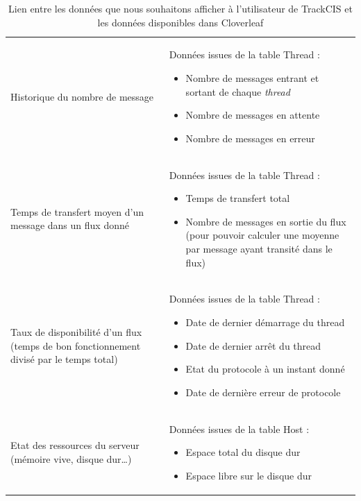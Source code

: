 			\begin{table}[H]
				\centering
				\caption{\label{donnees_threads} Lien entre les données que nous
				souhaitons afficher à l'utilisateur de TrackCIS et les données disponibles
				dans Cloverleaf}
				\begin{tabular}{| p{5cm} | p{8cm} |}
					\hline
						\thead{Type de statistique}
						&\thead{Données dans la table Thread}
						\\
					\hline
						Historique du nombre de message
						&
						Données issues de la table Thread :
						\begin{itemize}
						  \item Nombre de messages entrant et sortant de chaque \textit{thread}
						  \item Nombre de messages en attente
						  \item Nombre de messages en erreur
						\end{itemize}
						\\
					\hline
						Temps de transfert moyen d'un message dans un flux donné
						&
						Données issues de la table Thread :
						\begin{itemize}
						  \item Temps de transfert total
						  \item Nombre de messages en sortie du flux (pour pouvoir calculer une
						  moyenne par message ayant transité dans le flux)
						\end{itemize}
						\\
					\hline
						Taux de disponibilité d'un flux (temps de bon fonctionnement divisé par le
						temps total)
						&
						Données issues de la table Thread :
						\begin{itemize}
						  \item Date de dernier démarrage du thread
						  \item Date de dernier arrêt du thread
						  \item Etat du protocole à un instant donné
						  \item Date de dernière erreur de protocole
						\end{itemize}
						\\
					\hline
						Etat des ressources du serveur (mémoire vive, disque dur\ldots)
						&
						Données issues de la table Host :
						\begin{itemize}
						  \item Espace total du disque dur
						  \item Espace libre sur le disque dur

\end{itemize}
\end{tabular}
\end{table}
